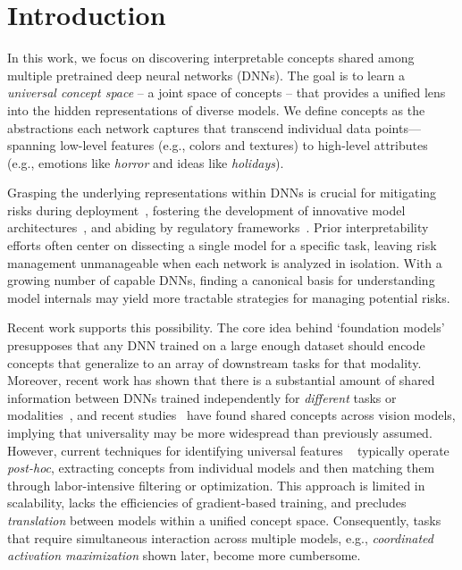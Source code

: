 
\vspace{-6mm}
\section{Introduction}
\vspace{1mm}

In this work, we focus on discovering interpretable concepts shared among multiple pretrained deep neural networks (DNNs).
The goal is to learn a \emph{universal concept space} -- a joint space of concepts -- that provides a unified lens into the hidden representations of diverse models. We define concepts as the abstractions each network captures that transcend individual data points—spanning low-level features (e.g., colors and textures) to high-level attributes (e.g., emotions like \emph{horror} and ideas like \emph{holidays}).



Grasping the underlying representations within DNNs is crucial for mitigating risks during deployment~\cite{buolamwini2018gender,hansson2021self}, fostering the development of innovative model architectures~\cite{darcet2023vision}, and abiding by regulatory frameworks~\cite{euro2021laying,whitehouse2023president}. 
Prior interpretability efforts often center on dissecting a single model for a specific task, leaving risk management unmanageable when each network is analyzed in isolation.
With a growing number of capable DNNs, finding a canonical basis for understanding model internals may yield more tractable strategies for managing potential risks.

Recent work supports this possibility.
The core idea behind `foundation models'~\cite{henderson2023foundation} presupposes that any DNN trained on a large enough dataset should encode concepts that generalize to an array of downstream tasks for that modality. Moreover, recent work has shown that there is a substantial amount of shared information between DNNs trained independently for \textit{different} tasks or modalities~\cite{huh2024platonic}, and recent studies~\cite{dravid2023rosetta, kowal2024understanding} have found shared concepts across vision models, implying that universality may be more widespread than previously assumed.
However, current techniques for identifying universal features
~\cite{dravid2023rosetta,huh2024platonic,kowal2024understanding} 
typically operate 
\emph{post-hoc},
extracting concepts from individual models and then matching them through labor-intensive filtering or optimization. This approach is limited in scalability, lacks the efficiencies of gradient-based training, and precludes \emph{translation} between models within a unified concept space. Consequently, tasks that require simultaneous interaction across multiple models, e.g., \emph{coordinated activation maximization} shown later, %
 become more cumbersome.



